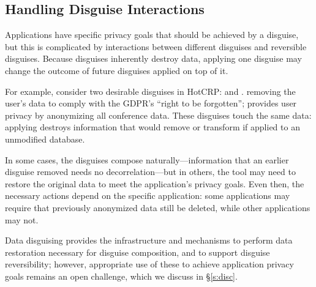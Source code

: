 \subsection{Handling Disguise Interactions}

Applications have specific privacy goals that should be achieved by a disguise,
but this is complicated by interactions between different disguises and reversible disguises.
%
Because disguises inherently destroy data, applying one disguise may change the outcome of future
disguises applied on top of it.

For example, consider two desirable disguises in HotCRP: \gdpr and \ca.
%
\gdpr removing the user's data to comply with the GDPR's ``right to be forgotten''; \ca provides
user privacy by anonymizing all conference data.
%
These disguises touch the same data: applying \ca destroys information that \gdpr would remove
or transform if applied to an unmodified database.
%

%
In some cases, the disguises compose naturally---\eg information that an earlier disguise removed
needs no decorrelation---but in others, the tool may need to restore the original data to meet the
application's privacy goals. Even then, the necessary actions depend on the specific application:
some applications may require that previously anonymized data still be deleted, while other
applications may not.
%

Data disguising provides the infrastructure and mechanisms to perform data restoration necessary for
disguise composition, and to support disguise reversibility; however, appropriate use of these to
achieve application privacy goals remains an open challenge, which we discuss in \S\ref{s:disc}.

